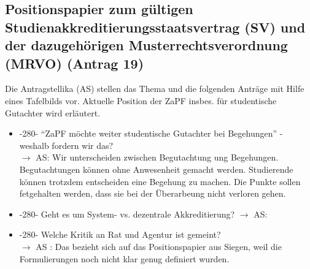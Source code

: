   \subsection{Positionspapier zum gültigen Studienakkreditierungsstaatsvertrag (SV) und der dazugehörigen Musterrechtsverordnung (MRVO) (Antrag 19)}
    Die Antragstellika (AS) stellen das Thema und die folgenden Anträge mit Hilfe eines Tafelbilds vor.
    Aktuelle Position der ZaPF insbes. für studentische Gutachter wird erläutert.

    \begin{itemize}
      \item -280- ``ZaPF möchte weiter studentische Gutachter bei Begehungen'' - weshalb fordern wir das? \\
        $\rightarrow$ AS: Wir unterscheiden zwischen Begutachtung ung Begehungen. Begutachtungen können ohne Anwesenheit gemacht werden. Studierende können trotzdem entscheiden eine Begehung zu machen. Die Punkte sollen fetgehalten werden, dass sie bei der Überarbeung nicht verloren gehen.

      \item -280- Geht es um System- vs. dezentrale Akkreditierung?
        $\rightarrow$ AS:

      \item -280- Welche Kritik an Rat und Agentur ist gemeint? \\
        $\rightarrow$ AS : Das bezieht sich auf das Positionspapier aus Siegen, weil die Formulierungen noch nicht klar genug definiert wurden.


\end{itemize}
